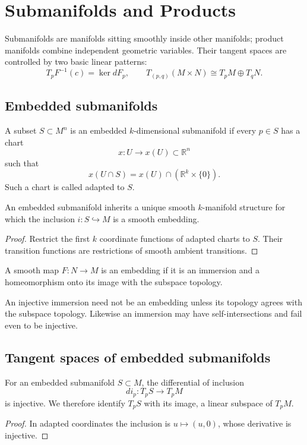 \chapter{Submanifolds and Products}
\label{ch:vii06-submanifolds-and-products}

Submanifolds are manifolds sitting smoothly inside other manifolds; product manifolds combine independent geometric variables. Their tangent spaces are controlled by two basic linear patterns:
\[
\boxed{T_pF^{-1}(c)=\ker dF_p,\qquad
T_{(p,q)}(M\times N)\cong T_pM\oplus T_qN.}
\]

\section{Embedded submanifolds}
\begin{definition}\label{def:vii06-embedded}
A subset \(S\subset M^n\) is an embedded \(k\)-dimensional submanifold if every \(p\in S\) has a chart
\[
x:U\to x(U)\subset\mathbb R^n
\]
such that
\[
x(U\cap S)=x(U)\cap(\mathbb R^k\times\{0\}).
\]
Such a chart is called adapted to \(S\).
\end{definition}

\begin{proposition}\label{prop:vii06-induced-structure}
An embedded submanifold inherits a unique smooth \(k\)-manifold structure for which the inclusion \(i:S\hookrightarrow M\) is a smooth embedding.
\end{proposition}
\begin{proof}
Restrict the first \(k\) coordinate functions of adapted charts to \(S\). Their transition functions are restrictions of smooth ambient transitions.
\end{proof}

\begin{definition}[Embedding]\label{def:vii06-embedding}
A smooth map \(F:N\to M\) is an embedding if it is an immersion and a homeomorphism onto its image with the subspace topology.
\end{definition}

\begin{warning}\label{warning:vii06-immersed-embedded}
An injective immersion need not be an embedding unless its topology agrees with the subspace topology. Likewise an immersion may have self-intersections and fail even to be injective.
\end{warning}

\section{Tangent spaces of embedded submanifolds}
\begin{theorem}\label{thm:vii06-tangent-inclusion}
For an embedded submanifold \(S\subset M\), the differential of inclusion
\[
di_p:T_pS\to T_pM
\]
is injective. We therefore identify \(T_pS\) with its image, a linear subspace of \(T_pM\).
\end{theorem}
\begin{proof}
In adapted coordinates the inclusion is \(u\mapsto(u,0)\), whose derivative is injective.
\end{proof}

